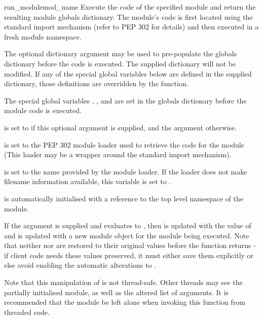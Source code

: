 \begin{funcdesc}{run_module}{mod_name
}
Execute the code of the specified module and return the resulting
module globals dictionary. The module's code is first located using
the standard import mechanism (refer to PEP 302 for details) and
then executed in a fresh module namespace.

The optional dictionary argument  may be used to
pre-populate the globals dictionary before the code is executed.
The supplied dictionary will not be modified. If any of the special
global variables below are defined in the supplied dictionary, those
definitions are overridden by the  function.

The special global variables , ,
 and  are set in the globals
dictionary before the module code is executed.

 is set to  if this optional argument is
supplied, and the  argument otherwise.

 is set to the PEP 302 module loader used to retrieve
the code for the module (This loader may be a wrapper around the
standard import mechanism).

 is set to the name provided by the module loader. If
the loader does not make filename information available, this
variable is set to .

 is automatically initialised with a reference to
the top level namespace of the  module.

If the argument  is supplied and evaluates to
, then  is updated with the value of
 and  is updated with a
new module object for the module being executed. Note that neither
 nor  are restored to
their original values before the function returns - if client code
needs these values preserved, it must either save them explicitly or
else avoid enabling the automatic alterations to .

Note that this manipulation of  is not thread-safe. Other
threads may see the partially initialised module, as well as the
altered list of arguments. It is recommended that the 
module be left alone when invoking this function from threaded code.
\end{funcdesc}

\begin{seealso}


\end{seealso}
